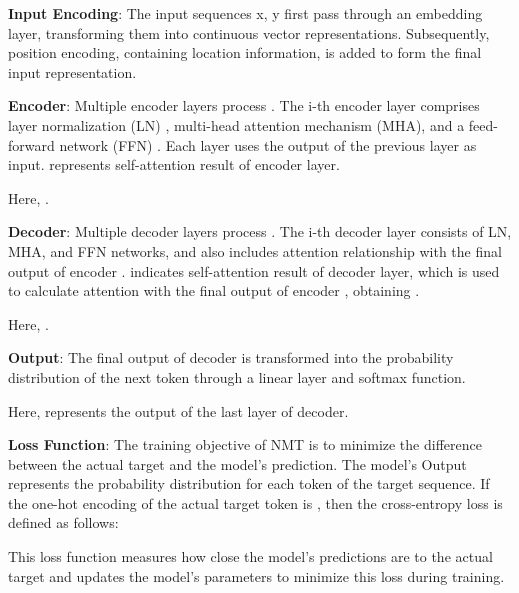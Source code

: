 \documentclass[conference]{IEEEtran}
\begin{document}
\textbf{Input Encoding}: The input sequences x, y first pass through an embedding layer, transforming them into continuous vector representations. Subsequently, position encoding, containing location information, is added to form the final input representation.




\textbf{Encoder}: Multiple encoder layers process . The i-th encoder layer  comprises layer normalization (LN) \cite{ba2016layer}, multi-head attention mechanism (MHA), and a feed-forward network (FFN) \cite{vaswani2017attention}. Each layer uses the output of the previous layer as input.  represents self-attention result of encoder layer.




Here, .

\textbf{Decoder}: Multiple decoder layers process . The i-th decoder layer  consists of LN, MHA, and FFN networks, and also includes attention relationship with the final output of encoder .  indicates self-attention result of decoder layer, which is used to calculate attention with the final output of encoder , obtaining .





Here, .

\textbf{Output}: The final output of decoder is transformed into the probability distribution of the next token through a linear layer and softmax function.



Here,  represents the output of the last layer of decoder.

\textbf{Loss Function}: The training objective of NMT is to minimize the difference between the actual target and the model's prediction. The model's Output represents the probability distribution for each token of the target sequence. If the one-hot encoding of the actual target token is , then the cross-entropy loss is defined as follows:



This loss function measures how close the model's predictions are to the actual target and updates the model's parameters to minimize this loss during training.
\end{document}
